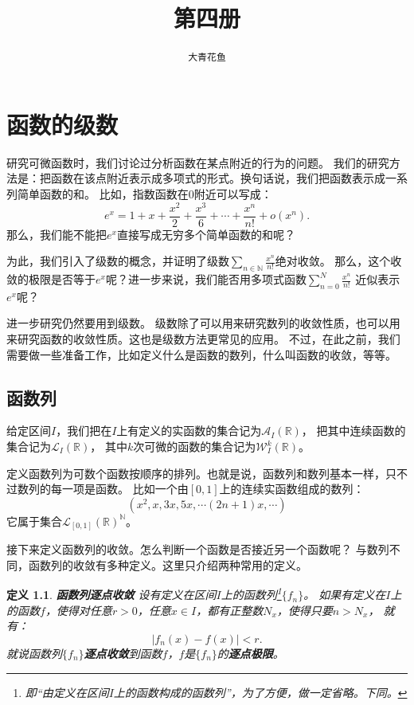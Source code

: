 \documentclass[12pt,UTF8]{ctexbook}
\title{\zihao{0} \bfseries 第四册}
\author{\zihao{2} \texttt{大青花鱼}}
\date{}
\newcommand{\olim}[1]{\mathit{o}\left(#1\right)}  %
\newtheorem{df}{定义}[section]
\begin{document}
\maketitle
\tableofcontents
\newpage

\chapter{函数的级数}

研究可微函数时，我们讨论过分析函数在某点附近的行为的问题。
我们的研究方法是：把函数在该点附近表示成多项式的形式。换句话说，我们把函数表示成一系列简单函数的和。
比如，指数函数在$0$附近可以写成：
$$e^x = 1 + x + \frac{x^2}{2} + \frac{x^3}{6} + \cdots + \frac{x^n}{n!} + \olim{x^n}.$$
那么，我们能不能把$e^x$直接写成无穷多个简单函数的和呢？

为此，我们引入了级数的概念，并证明了级数$\sum_{n\in\mathbb{N}}\frac{x^{n}}{n!}$绝对收敛。
那么，这个收敛的极限是否等于$e^x$呢？进一步来说，我们能否用多项式函数$\sum_{n=0}^N\frac{x^{n}}{n!}$
近似表示$e^x$呢？

进一步研究仍然要用到级数。
级数除了可以用来研究数列的收敛性质，也可以用来研究函数的收敛性质。这也是级数方法更常见的应用。
不过，在此之前，我们需要做一些准备工作，比如定义什么是函数的数列，什么叫函数的收敛，等等。

\section{函数列}

给定区间$I$，我们把在$I$上有定义的实函数的集合记为$\mathcal{A}_I(\mathbb{R})$，
把其中连续函数的集合记为$\mathcal{L}_I(\mathbb{R})$，
其中$k$次可微的函数的集合记为$\mathcal{W}_I^k(\mathbb{R})$。

定义函数列为可数个函数按顺序的排列。也就是说，函数列和数列基本一样，只不过数列的每一项是函数。
比如一个由$[0,1]$上的连续实函数组成的数列：
$$ (x^2, x, 3x, 5x, \cdots (2n+1)x, \cdots )$$
它属于集合$\mathcal{L}_{[0,1]}(\mathbb{R})^{\mathbb{N}}$。

接下来定义函数列的收敛。怎么判断一个函数是否接近另一个函数呢？
与数列不同，函数列的收敛有多种定义。这里只介绍两种常用的定义。
\begin{df}{\textbf{函数列逐点收敛}}
    设有定义在区间$I$上的函数列\footnote{即“由定义在区间$I$上的函数构成的函数列”，为了方便，做一定省略。下同。}$\{f_n\}$。
    如果有定义在$I$上的函数$f$，使得对任意$r>0$，任意$x\in I$，都有正整数$N_x$，使得只要$n>N_x$，
    就有：
    $$ |f_n(x) - f(x) | < r.$$
    就说函数列$\{f_n\}$\textbf{逐点收敛}到函数$f$，$f$是$\{f_n\}$的\textbf{逐点极限}。
\end{df}
\end{document}
